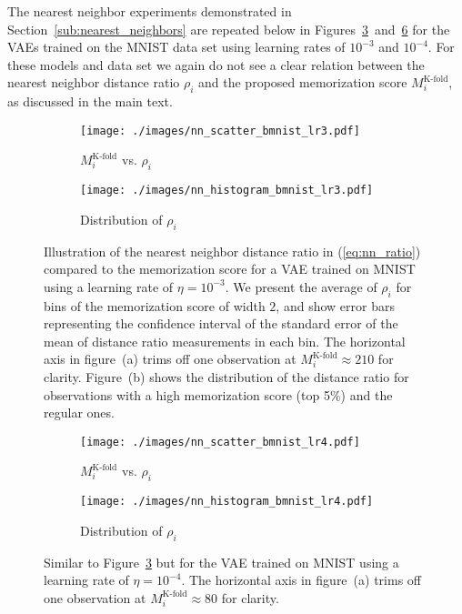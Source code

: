 \documentclass{article}
\begin{document}
The nearest neighbor experiments demonstrated in 
Section~\ref{sub:nearest_neighbors} are repeated below in 
Figures~\ref{fig:nn_vs_mem_mnist_lr3}~and~\ref{fig:nn_vs_mem_mnist_lr4} for 
the VAEs trained on the MNIST data set using learning rates of $10^{-3}$ and 
$10^{-4}$. For these models and data set we again do not see a clear relation 
between the nearest neighbor distance ratio $\rho_i$ and the proposed 
memorization score $M^{\text{K-fold}}_i$, as discussed in the main text.

\begin{figure}[h]
	\centering
	\captionsetup[subfigure]{justification=centering}%
	\begin{subfigure}[b]{.40\textwidth}
		\texttt{[image: ./images/nn\_scatter\_bmnist\_lr3.pdf]}
		\caption{$M^{\text{K-fold}}_i$ vs. $\rho_i$ 
			\label{fig:nn_vs_mem_scatter_mnist_lr3}}
	\end{subfigure}
	\qquad
	\qquad
	\begin{subfigure}[b]{.40\textwidth}
		\texttt{[image: ./images/nn\_histogram\_bmnist\_lr3.pdf]}
		\caption{Distribution of $\rho_i$ 
			\label{fig:nn_vs_mem_hist_mnist_lr3}}
	\end{subfigure}
	\caption{Illustration of the nearest neighbor distance ratio in 
		(\ref{eq:nn_ratio}) compared to the memorization score for a 
		VAE trained on MNIST using a learning rate of $\eta = 
		10^{-3}$. We present the average of $\rho_i$ for bins of the 
		memorization score of width $2$, and show error bars 
		representing the confidence interval of the standard error of 
		the mean of distance ratio measurements in each bin.  The 
		horizontal axis in figure~(a) trims off one observation at 
		$M^{\text{K-fold}}_i \approx 210$ for clarity. Figure~(b) 
		shows the distribution of the distance ratio for observations 
		with a high memorization score (top 5\%) and the regular 
		ones.}%
	\label{fig:nn_vs_mem_mnist_lr3}
\end{figure}

\begin{figure}[h]
	\centering
	\captionsetup[subfigure]{justification=centering}%
	\begin{subfigure}[b]{.40\textwidth}
		\texttt{[image: ./images/nn\_scatter\_bmnist\_lr4.pdf]}
		\caption{$M^{\text{K-fold}}_i$ vs. $\rho_i$ 
			\label{fig:nn_vs_mem_scatter_mnist_lr4}}
	\end{subfigure}
	\qquad
	\qquad
	\begin{subfigure}[b]{.40\textwidth}
		\texttt{[image: ./images/nn\_histogram\_bmnist\_lr4.pdf]}
		\caption{Distribution of $\rho_i$ 
			\label{fig:nn_vs_mem_hist_mnist_lr4}}
	\end{subfigure}
	\caption{Similar to Figure~\ref{fig:nn_vs_mem_mnist_lr3} but for the 
		VAE trained on MNIST using a learning rate of $\eta = 
		10^{-4}$. The horizontal axis in figure~(a) trims off one 
		observation at $M^{\text{K-fold}}_i \approx 80$ for clarity.}%
	\label{fig:nn_vs_mem_mnist_lr4}
\end{figure}
\end{document}
